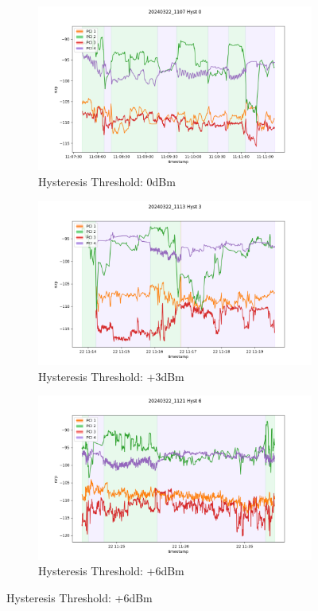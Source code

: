\begin{figure}[p]
    \centering
    \caption{Hysteresis values effects on HO rate}
    \label{fig:methods:hysteresis}
    \begin{subfigure}{\linewidth}
        \centering
        \includegraphics[width=0.6\linewidth]{src//img/5hyst0.png}
        \caption{Hysteresis Threshold: 0dBm}
        \label{fig:methods:hyst0}
    \end{subfigure}
    
    \begin{subfigure}{.9\linewidth}
        \centering
        \includegraphics[width=0.6\linewidth]{src//img/5hyst3.png}
        \caption{Hysteresis Threshold: +3dBm}
        \label{fig:methods:hyst3}
    \end{subfigure}
    
    \begin{subfigure}{\linewidth}
        \centering
        \includegraphics[width=0.6\linewidth]{src//img/5hyst6.png}
        \caption{Hysteresis Threshold: +6dBm}
        \label{fig:methods:hyst6}
    \end{subfigure}
    

\end{figure}
